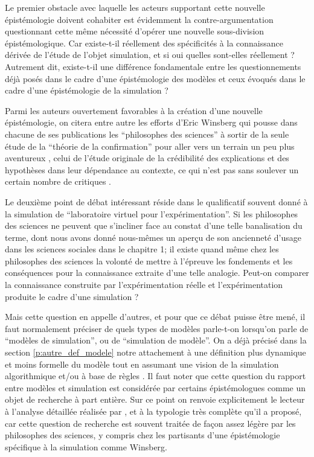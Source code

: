 Le premier obstacle avec laquelle les acteurs supportant cette nouvelle épistémologie doivent cohabiter est évidemment la contre-argumentation questionnant cette même nécessité d'opérer une nouvelle sous-division épistémologique. Car existe-t-il réellement des spécificités à la connaissance dérivée de l'étude de l'objet simulation, et si oui quelles sont-elles réellement ? Autrement dit, existe-t-il une différence fondamentale entre les questionnements déjà posés dans le cadre d'une épistémologie des modèles et ceux évoqués dans le cadre d'une épistémologie de la simulation ?

Parmi les auteurs ouvertement favorables à la création d'une nouvelle épistémologie, on citera entre autre les efforts d'Eric Winsberg \autocites{Winsberg2001, Winsberg2009, Winsberg2013} qui pousse dans chacune de ses publications les \enquote{philosophes des sciences} à sortir de la seule étude de la \enquote{théorie de la confirmation} pour aller vers un terrain un peu plus aventureux , celui de l'étude originale  de la crédibilité des explications et des hypothèses dans leur dépendance au contexte, ce qui n'est pas sans soulever un certain nombre de critiques .

Le deuxième point de débat intéressant réside dans le qualificatif souvent donné à la simulation de \enquote{laboratoire virtuel pour l'expérimentation}. Si les philosophes des sciences ne peuvent que s'incliner face au constat d'une telle banalisation du terme, dont nous avons donné nous-mêmes un aperçu de son ancienneté d'usage dans les sciences sociales dans le chapitre 1; il existe quand même chez les philosophes des sciences la volonté de mettre à l'épreuve les fondements et les conséquences pour la connaissance extraite d'une telle analogie. Peut-on comparer la connaissance construite par l'expérimentation réelle et l'expérimentation produite le cadre d'une simulation ?

Mais cette question en appelle d'autres, et pour que ce débat puisse être mené, il faut normalement préciser de quels types de modèles parle-t-on lorsqu'on parle de \enquote{modèles de simulation}, ou de \enquote{simulation de modèle}. On a déjà précisé dans la section \ref{p:autre_def_modele} notre attachement à une définition plus dynamique et moins formelle du modèle \autocites{Haggett1965,Langlois2005} tout en assumant une vision de la simulation algorithmique et/ou à base de règles \autocite{Varenne2013b}. Il faut noter que cette question du rapport entre modèles et simulation est considérée par certains épistémologues comme un objet de recherche à part entière. Sur ce point on renvoie explicitement le lecteur à l'analyse détaillée réalisée par \textcite{Varenne2013b}, et à la typologie très complète qu'il a proposé, car cette question de recherche est souvent traitée de façon assez légère par les philosophes des sciences, y compris chez les partisants d'une épistémologie spécifique à la simulation comme Winsberg.


